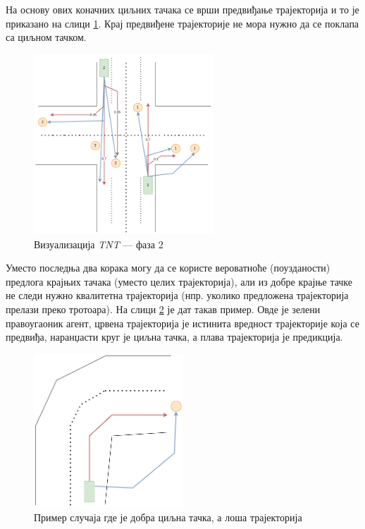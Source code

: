 \documentclass[11pt,oneside]{memoir}
\begin{document}
На основу ових коначних циљних тачака се врши предвиђање трајекторија и то је приказано на слици \ref{tnt-viz-2}. Крај предвиђене трајекторије не мора
нужно да се поклапа са циљном тачком.

\begin{figure}[H]
  \centering
  \includegraphics[width=0.6\textwidth]{images/tnt-viz-Page-2.drawio.png}
  \caption{Визуализација \textit{TNT} --- фаза 2 \label{tnt-viz-2}}
\end{figure}

Уместо последња два корака могу да се користе вероватноће (поузданости) предлога крајњих тачака (уместо целих трајекторија),
али из добре крајње тачке не следи
нужно квалитетна трајекторија (нпр. уколико предложена трајекторија прелази преко тротоара). На слици \ref{tnt-good-target-bad-traj}
је дат такав пример. Овде је зелени правоугаоник агент, црвена трајекторија је истинита вредност трајекторије која се предвиђа, 
наранџасти круг је циљна тачка, а плава трајекторија је предикција. 

\begin{figure}[H]
  \centering
  \includegraphics[width=0.5\textwidth]{images/tnt-good-end-point-and-bad-traj.drawio.png}
  \caption{Пример случаја где је добра циљна тачка, а лоша трајекторија \label{tnt-good-target-bad-traj}}
\end{figure}
\end{document}
